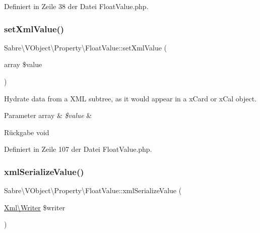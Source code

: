 Definiert in Zeile 38 der Datei Float\+Value.\+php.

\mbox{\label{class_sabre_1_1_v_object_1_1_property_1_1_float_value_aa8fd2f134179b3cdc6b38518d9ddbac1}} 
\subsubsection{\texorpdfstring{set\+Xml\+Value()}{setXmlValue()}}
{\footnotesize\ttfamily Sabre\textbackslash{}\+V\+Object\textbackslash{}\+Property\textbackslash{}\+Float\+Value\+::set\+Xml\+Value (\begin{DoxyParamCaption}\item[{array}]{\$value }\end{DoxyParamCaption})}

Hydrate data from a X\+ML subtree, as it would appear in a x\+Card or x\+Cal object.


\begin{DoxyParams}[1]{Parameter}
array & {\em \$value} & \\
\hline
\end{DoxyParams}
\begin{DoxyReturn}{Rückgabe}
void 
\end{DoxyReturn}


Definiert in Zeile 107 der Datei Float\+Value.\+php.

\mbox{\label{class_sabre_1_1_v_object_1_1_property_1_1_float_value_aa248cbb4b44304ab3e953b954046e798}} 
\subsubsection{\texorpdfstring{xml\+Serialize\+Value()}{xmlSerializeValue()}}
{\footnotesize\ttfamily Sabre\textbackslash{}\+V\+Object\textbackslash{}\+Property\textbackslash{}\+Float\+Value\+::xml\+Serialize\+Value (\begin{DoxyParamCaption}\item[{\mbox{\hyperlink{class_sabre_1_1_xml_1_1_writer}{Xml\textbackslash{}\+Writer}}}]{\$writer }\end{DoxyParamCaption})\hspace{0.3cm}{\ttfamily [protected]}}

